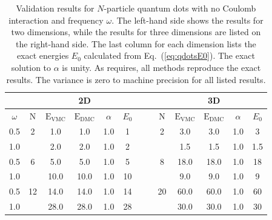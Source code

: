 \setlength{\tabcolsep}{0.3cm}
\begin{table}[h]
\begin{center}
\begin{tabular}{c|cccccc||cccccc}
 & & & 2D & & & & & & & 3D \\
\hline
  $\omega$   & N & $\mathrm{E_{VMC}}$ & $\mathrm{E_{DMC}}$ & $\alpha$ & $E_0$ & \qquad  & \qquad &  N   & $\mathrm{E_{VMC}}$ & $\mathrm{E_{DMC}}$ & $\alpha$ & $E_0$ \\
\hline
 0.5 &   2   &   1.0    &   1.0    &   1.0    & 1  & \qquad & \qquad & 2     &   3.0   &   3.0    &   1.0    & 3 \\
 1.0 &       &   2.0    &   2.0    &   1.0    & 2  & \qquad & \qquad &       &   1.5   &   1.5    &   1.0    & 1.5 \\
 0.5 &   6   &   5.0    &   5.0    &   1.0    & 5  & \qquad & \qquad &  8    &   18.0  &   18.0   &   1.0    & 18 \\
 1.0 &       &   10.0   &   10.0   &   1.0    & 10 & \qquad & \qquad &       &  9.0    &   9.0    &   1.0    & 9 \\
 0.5 &   12  &   14.0   &   14.0   &   1.0    & 14 & \qquad & \qquad & 20    &  60.0   &   60.0   &   1.0    & 60 \\
 1.0 &       &   28.0   &   28.0   &   1.0    & 28 & \qquad & \qquad &       &  30.0   &   30.0   &   1.0    & 30 \\
\end{tabular}
\caption{Validation results for $N$-particle quantum dots with no Coulomb interaction and frequency $\omega$. The left-hand side shows the results for two dimensions, while the results for three dimensions are listed on the right-hand side. The last column for each dimension lists the exact energies $E_0$ calculated from Eq.~(\ref{eq:qdotsE0}). The exact solution to $\alpha$ is unity. As requires, all methods reproduce the exact results. The variance is zero to machine precision for all listed results.}
\label{tab:res_valid_qdots}
\end{center}
\end{table}
\setlength{\tabcolsep}{6pt}

